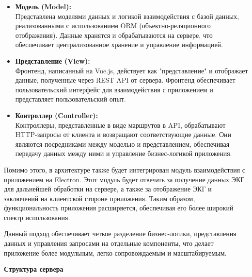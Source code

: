 \documentclass[12pt, russian]{extarticle}
\begin{document}
\begin{spacing}{1.5}
\begin{itemize}
    \item \textbf{Модель (Model):} \\
        Представлена моделями данных и логикой взаимодействия с базой данных, реализованными с использованием ORM (объектно-реляционного отображения). Данные хранятся и обрабатываются на сервере, что обеспечивает централизованное хранение и управление информацией.
    \item \textbf{Представление (View):} \\
        Фронтенд, написанный на Vue.js, действует как "представление" и отображает данные, полученные через REST API от сервера. Фронтенд обеспечивает пользовательский интерфейс для взаимодействия с приложением и представляет пользовательский опыт.
    \item \textbf{Контроллер (Controller):} \\
        Контроллеры, представленные в виде маршрутов в API, обрабатывают HTTP-запросы от клиента и возвращают соответствующие данные. Они являются посредниками между моделью и представлением, обеспечивая передачу данных между ними и управление бизнес-логикой приложения.
\end{itemize}

Помимо этого, в архитектуре также будет интегрирован модуль взаимодействия с приложением на Electron. Этот модуль будет отвечать за получение данных ЭКГ для дальнейшей обработки на сервере, а также за отображение ЭКГ и заключений на клиентской стороне приложения. Таким образом, функциональность приложения расширяется, обеспечивая его более широкий спектр использования.

Данный подход обеспечивает четкое разделение бизнес-логики, представления данных и управления запросами на отдельные компоненты, что делает приложение более модульным, легко сопровождаемым и масштабируемым.


\par \noindent \textbf{Структура сервера}


\end{spacing}
\end{document}

